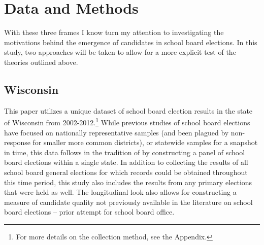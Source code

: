 {%


\section{Data and Methods}

With these three frames I know turn my attention to investigating the motivations 
behind the emergence of candidates in school board elections. In this study, two 
approaches will be taken to allow for a more explicit test of the theories outlined 
above. 

\subsection{Wisconsin}

This paper utilizes a unique dataset of school board election results in the state 
of Wisconsin from 2002-2012.\footnote{For more details on the collection method, 
see the Appendix.} While previous studies of school board elections have focused 
on nationally representative samples (and been plagued by non-response for smaller 
more common districts), or statewide samples for a snapshot in time, this data follows in the 
tradition of \citet{RefWorks:311} by constructing a panel of school board elections 
within a single state. In addition to collecting the results of all school board 
general elections for which records could be obtained throughout this time period, 
this study also includes the results from any primary elections that were held 
as well. The longitudinal look also allows for constructing a measure of candidate 
quality not previously available in the literature on school board elections -- 
prior attempt for school board office. 

}
